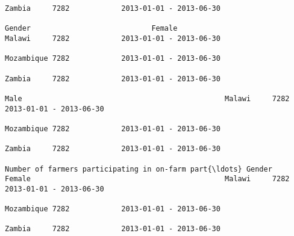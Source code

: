 \documentclass[11pt]{article}
\begin{document}
\begin{Verbatim}[commandchars=\\\{\}]
                                                                                                                                                                                                                 Zambia     7282            2013-01-01 - 2013-06-30   
                                                                                                                            Gender                            Female                                             Malawi     7282            2013-01-01 - 2013-06-30   
                                                                                                                                                                                                                 Mozambique 7282            2013-01-01 - 2013-06-30   
                                                                                                                                                                                                                 Zambia     7282            2013-01-01 - 2013-06-30   
                                                                                                                                                              Male                                               Malawi     7282            2013-01-01 - 2013-06-30   
                                                                                                                                                                                                                 Mozambique 7282            2013-01-01 - 2013-06-30   
                                                                                                                                                                                                                 Zambia     7282            2013-01-01 - 2013-06-30   
                                                                         Number of farmers participating in on-farm part{\ldots} Gender                            Female                                             Malawi     7282            2013-01-01 - 2013-06-30   
                                                                                                                                                                                                                 Mozambique 7282            2013-01-01 - 2013-06-30   
                                                                                                                                                                                                                 Zambia     7282            2013-01-01 - 2013-06-30   

\end{Verbatim}
\end{document}

